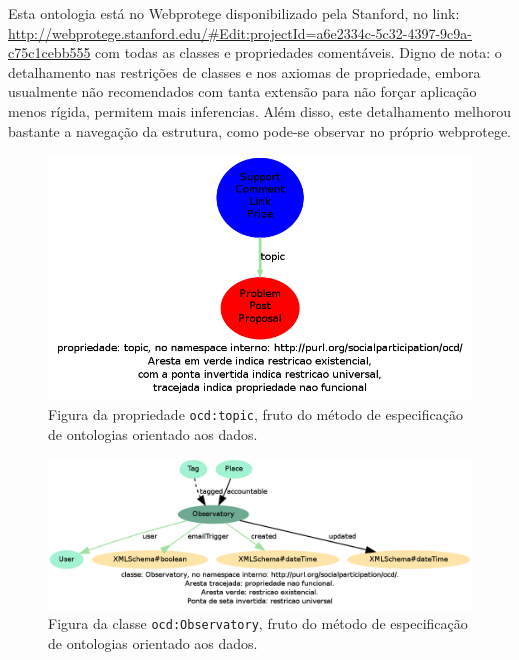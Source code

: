 \documentclass[12pt]{article}
\begin{document}
Esta ontologia está no Webprotege disponibilizado pela Stanford, no link: \url{http://webprotege.stanford.edu/#Edit:projectId=a6e2334c-5c32-4397-9c9a-c75c1cebb555} com todas as classes e propriedades comentáveis. Digno de nota: o detalhamento nas restrições de classes e nos axiomas de propriedade, embora usualmente não recomendados com tanta extensão para não forçar aplicação menos rígida, permitem mais inferencias. Além disso, este detalhamento melhorou bastante a navegação da estrutura, como pode-se observar no próprio webprotege.

\begin{figure}[h!]
  \centering
    \includegraphics[width=\textwidth]{../figs/topic.png}
  \caption{Figura da propriedade \texttt{ocd:topic}, fruto do método de especificação de ontologias orientado aos dados.}\label{fig:ocdp}
\end{figure}

\begin{figure}[h!]
  \centering
    \includegraphics[width=\textwidth]{../figs/Observatory.png}
  \caption{Figura da classe \texttt{ocd:Observatory}, fruto do método de especificação de ontologias orientado aos dados.}\label{fig:ocdc}
\end{figure}
\end{document}
